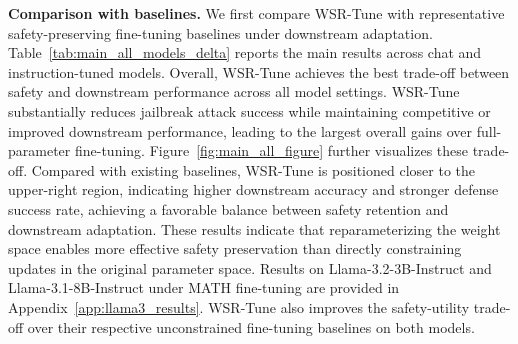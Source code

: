\documentclass{article}
\begin{document}
\textbf{Comparison with baselines.}
We first compare WSR-Tune with representative safety-preserving fine-tuning baselines under downstream adaptation. Table~\ref{tab:main_all_models_delta} reports the main results across chat and instruction-tuned models. Overall, WSR-Tune achieves the best trade-off between safety and downstream performance across all model settings. WSR-Tune substantially reduces jailbreak attack success while maintaining competitive or improved downstream performance, leading to the largest overall gains over full-parameter fine-tuning.
Figure~\ref{fig:main_all_figure} further visualizes these trade-off. Compared with existing baselines, WSR-Tune is positioned closer to the upper-right region, indicating higher downstream accuracy and stronger defense success rate, achieving a favorable balance between safety retention and downstream adaptation. These results indicate that reparameterizing the weight space enables more effective safety preservation than directly constraining updates in the original parameter space. 
Results on Llama-3.2-3B-Instruct and Llama-3.1-8B-Instruct under MATH fine-tuning are provided in Appendix~\ref{app:llama3_results}. WSR-Tune also improves the safety-utility trade-off over their respective unconstrained fine-tuning baselines on both models.





\end{document}
